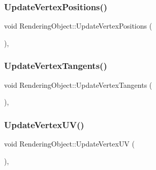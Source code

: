 \hypertarget{class_rendering_object_a7a097727acf37f9671ddd5e3a9873771}{}\label{class_rendering_object_a7a097727acf37f9671ddd5e3a9873771} 
\subsubsection{\texorpdfstring{Update\+Vertex\+Positions()}{UpdateVertexPositions()}}
{\footnotesize\ttfamily void Rendering\+Object\+::\+Update\+Vertex\+Positions (\begin{DoxyParamCaption}{ }\end{DoxyParamCaption})\hspace{0.3cm}{\ttfamily [protected]}, {\ttfamily [virtual]}}

\hypertarget{class_rendering_object_a5b480a9b97cadfa07669902764139272}{}\label{class_rendering_object_a5b480a9b97cadfa07669902764139272} 
\subsubsection{\texorpdfstring{Update\+Vertex\+Tangents()}{UpdateVertexTangents()}}
{\footnotesize\ttfamily void Rendering\+Object\+::\+Update\+Vertex\+Tangents (\begin{DoxyParamCaption}{ }\end{DoxyParamCaption})\hspace{0.3cm}{\ttfamily [protected]}, {\ttfamily [virtual]}}

\hypertarget{class_rendering_object_ac00889f2afaa605b09164649ef68a1b6}{}\label{class_rendering_object_ac00889f2afaa605b09164649ef68a1b6} 
\subsubsection{\texorpdfstring{Update\+Vertex\+U\+V()}{UpdateVertexUV()}}
{\footnotesize\ttfamily void Rendering\+Object\+::\+Update\+Vertex\+UV (\begin{DoxyParamCaption}{ }\end{DoxyParamCaption})\hspace{0.3cm}{\ttfamily [protected]}, {\ttfamily [virtual]}}



